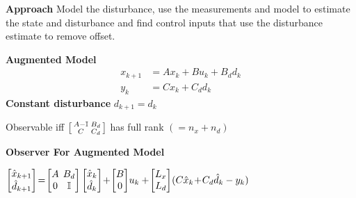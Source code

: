 \textbf{Approach}
Model the disturbance,
use the measurements and model
to estimate the state and disturbance
and find control inputs that use
the disturbance estimate to remove offset.

\textbf{Augmented Model}
\begin{align*}
	x_{k+1} & = Ax_k + Bu_k + B_d d_k \\
	y_k     & = Cx_k + C_d d_k
\end{align*}
\textbf{Constant disturbance}
$d_{k+1}  = d_k$

Observable iff
$\begin{bsmallmatrix}
		A - \mathbb{I} & B_d \\ C & C_d
	\end{bsmallmatrix}$
has full rank $(=n_x + n_d)$

\textbf{Observer For Augmented Model}

$
	\begin{bmatrix}
		\hat{x}_{k+1} \\
		\hat{d}_{k+1}
	\end{bmatrix}
	\!=\!
	\begin{bmatrix}
		A & \hspace{-2mm} B_d       \\
		0 & \hspace{-2mm}\mathbb{I}
	\end{bmatrix}
	\begin{bmatrix}
		\hat{x}_{k} \\
		\hat{d}_{k}
	\end{bmatrix}
	\!+\!
	\begin{bmatrix}
		B \\
		0
	\end{bmatrix}
	\!u_{k}
	+
	\hspace{-.5mm}
	\begin{bmatrix}
		L_x \\
		L_d
	\end{bmatrix}
	\hspace{-.5mm}
	(C\hat{x}_{k} \!+\! C_d \hat{d}_{k}-y_{k})
$

